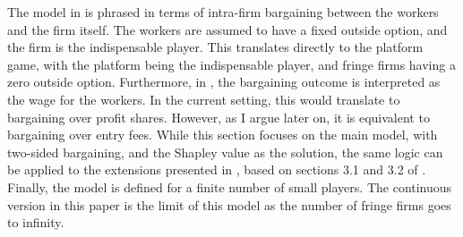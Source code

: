 \documentclass[a4paper]{article}
\begin{document}
The model in \textcite{stole1996intra} is phrased in terms of intra-firm bargaining between the workers and the firm itself.
The workers are assumed to have a fixed outside option, and the firm is the indispensable player.
This translates directly to the platform game, with the platform being the indispensable player, and fringe firms having a zero outside option.
Furthermore, in \textcite{stole1996intra}, the bargaining outcome is interpreted as the wage for the workers.
In the current setting, this would translate to bargaining over profit shares.
However, as I argue later on, it is equivalent to bargaining over entry fees.
While this section focuses on the main model, with two-sided bargaining, and the Shapley value as the solution, the same logic can be applied to the extensions presented in , based on sections 3.1 and 3.2 of \textcite{stole1996intra}.
Finally, the model is defined for a finite number of small players.
The continuous version in this paper is the limit of this model as the number of fringe firms goes to infinity.
\end{document}
